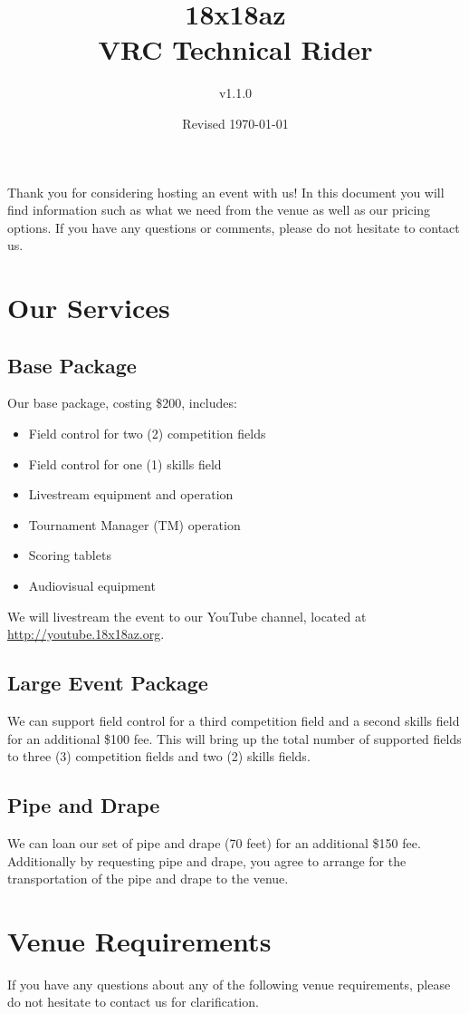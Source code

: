 \documentclass[12pt]{article}
\title{18x18az\\VRC Technical Rider}
\author{v1.1.0}
\date{Revised \today}
\begin{document}
\maketitle
Thank you for considering hosting an event with us!
In this document you will find information such as what we need from the venue as well as our pricing options.
If you have any questions or comments, please do not hesitate to contact us.
\tableofcontents
\pagebreak
\section{Our Services}
\subsection{Base Package}
Our base package, costing \$200, includes:
\begin{itemize}
    \item Field control for two (2) competition fields
    \item Field control for one (1) skills field
    \item Livestream equipment and operation
    \item Tournament Manager (TM) operation
    \item Scoring tablets
    \item Audiovisual equipment
\end{itemize}

\noindent We will livestream the event to our YouTube channel, located at \\\url{http://youtube.18x18az.org}.

\subsection{Large Event Package}
We can support field control for a third competition field and a second skills field for an additional \$100 fee.
This will bring up the total number of supported fields to three (3) competition fields and two (2) skills fields.

\subsection{Pipe and Drape}
We can loan our set of pipe and drape (70 feet) for an additional \$150 fee.
Additionally by requesting pipe and drape, you agree to arrange for the transportation of the pipe and drape to the venue.

\section{Venue Requirements}
If you have any questions about any of the following venue requirements, please do not hesitate to contact us for clarification.
\end{document}
